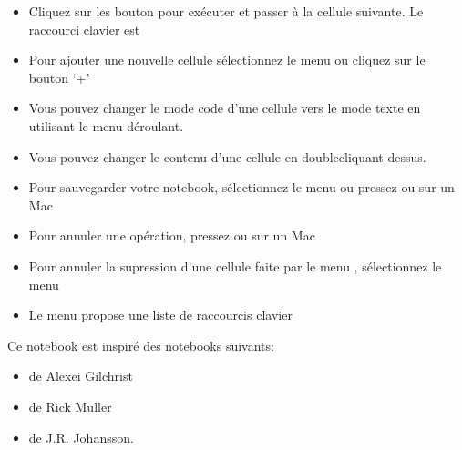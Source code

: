 \documentclass[letterpaper,10pt,english]{sphinxmanual}
\begin{document}
\begin{itemize}
\item {} 
Cliquez sur les bouton  pour exécuter et passer à la cellule suivante. Le raccourci clavier est 

\item {} 
Pour ajouter une nouvelle cellule sélectionnez le menu  ou cliquez sur le bouton ‘+’

\item {} 
Vous pouvez changer le mode code d’une cellule vers le mode texte en utilisant le menu déroulant.

\item {} 
Vous pouvez changer le contenu d’une cellule en double\sphinxhyphen{}cliquant dessus.

\item {} 
Pour sauvegarder votre notebook, sélectionnez le menu  ou pressez  ou  sur un Mac

\item {} 
Pour annuler une opération, pressez  ou  sur un Mac

\item {} 
Pour annuler la supression d’une cellule faite par le menu , sélectionnez le menu 

\item {} 
Le menu  propose une liste de raccourcis clavier

\end{itemize}

Ce notebook est inspiré des notebooks suivants:
\begin{itemize}
\item {} 
 de Alexei Gilchrist

\item {} 
 de Rick Muller

\item {} 
 de J.R. Johansson.

\end{itemize}
\end{document}
